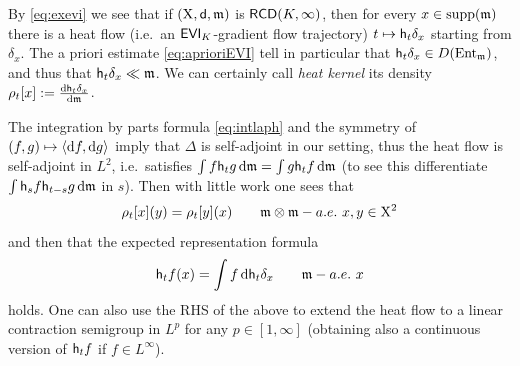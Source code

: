 \documentclass[11pt]{article}
\numberwithin{equation}{section}
\newcommand{\X}{{\rm X}}
\newcommand{\sfd}{{\sf d}}
\newcommand{\mm}{{\mathfrak m}}
\newcommand{\RCD}{{\sf RCD}}
\newcommand{\ent}{{\rm Ent}_\mm}
\renewcommand{\d}{{\rm d}}
\newcommand{\supp}{{\rm supp}}
\newcommand{\h}{{\sf h}} %
\newcommand\la{\langle}
\newcommand\ra{\rangle}
\newcommand{\EVI}{{\sf EVI}}
\begin{document}
By \eqref{eq:exevi} we see that if $(\X,\sfd,\mm)$ is $\RCD(K,\infty)$, then for every $x\in\supp(\mm)$ there is a heat flow (i.e.\ an $\EVI_K$-gradient flow trajectory) $t\mapsto\h_t\delta_x$ starting from $\delta_x$. The a priori estimate \eqref{eq:aprioriEVI} tell in particular that $\h_t\delta_x\in D(\ent)$, and thus that $\h_t\delta_x\ll\mm$. We can certainly call  \emph{heat kernel} its density $\rho_t[x]:=\tfrac{\d\h_t\delta_x}{\d\mm}$.

The integration by parts formula \eqref{eq:intlaph} and the symmetry of $(f,g)\mapsto\la\d f,\d g\ra$ imply that $\Delta$ is self-adjoint in our setting, thus the heat flow is self-adjoint in $L^2$, i.e.\ satisfies $\int f\h_tg\,\d\mm=\int g\h_tf\,\d\mm$ (to see this differentiate $\int \h_sf\h_{t-s}g\,\d\mm$ in $s$). Then with little work one sees that
\[
\rho_t[x](y)=\rho_t[y](x)\qquad\mm\otimes\mm-a.e.\ x,y\in\X^2
\]
and then that the expected representation formula
\begin{equation}
\label{eq:reprform}
\h_tf(x)=\int f\,\d\h_t\delta_x\qquad\mm-a.e.\ x
\end{equation}
holds. One can also use the RHS of the above to extend the heat flow to a linear contraction semigroup in $L^p$ for any $p\in[1,\infty]$ (obtaining also a continuous version of $\h_tf$ if $f\in L^\infty$).
\end{document}
